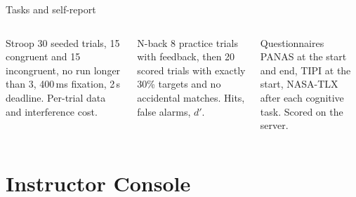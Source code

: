 \documentclass[aspectratio=169,11pt]{beamer}
\newcommand{\code}[1]{{\small\texttt{#1}}}
\begin{document}
\begin{frame}{Tasks and self-report}
  \begin{columns}[T]
    \begin{block}{Stroop}
      \footnotesize 30 seeded trials, 15 congruent and 15 incongruent, no run longer than 3, 400\,ms fixation, 2\,s deadline. Per-trial data and interference cost.
    \end{block}
    \begin{block}{N-back}
      \footnotesize 8 practice trials with feedback, then 20 scored trials with exactly 30\% targets and no accidental matches. Hits, false alarms, $d'$.
    \end{block}
    \begin{block}{Questionnaires}
      \footnotesize PANAS at the start and end, TIPI at the start, NASA-TLX after each cognitive task. Scored on the server.
    \end{block}
  \end{columns}
  \vspace{0.8em}
  \centering
\end{frame}

\section{Instructor Console}
\end{document}
